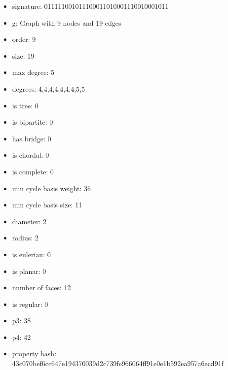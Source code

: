 \newpage
\begin{figure}
\end{figure}
\begin{itemize}
\item signature: 011111001011100011010001110010001011
\item g: Graph with 9 nodes and 19 edges
\item order: 9
\item size: 19
\item max degree: 5
\item degrees: 4,4,4,4,4,4,4,5,5
\item is tree: 0
\item is bipartite: 0
\item has bridge: 0
\item is chordal: 0
\item is complete: 0
\item min cycle basis weight: 36
\item min cycle basis size: 11
\item diameter: 2
\item radius: 2
\item is eulerian: 0
\item is planar: 0
\item number of faces: 12
\item is regular: 0
\item p3: 38
\item p4: 42
\item property hash: 43c070bef6cc647e194370039d2c739fe966064ff91e0e1b592ea957a6ecd91f
\end{itemize}
